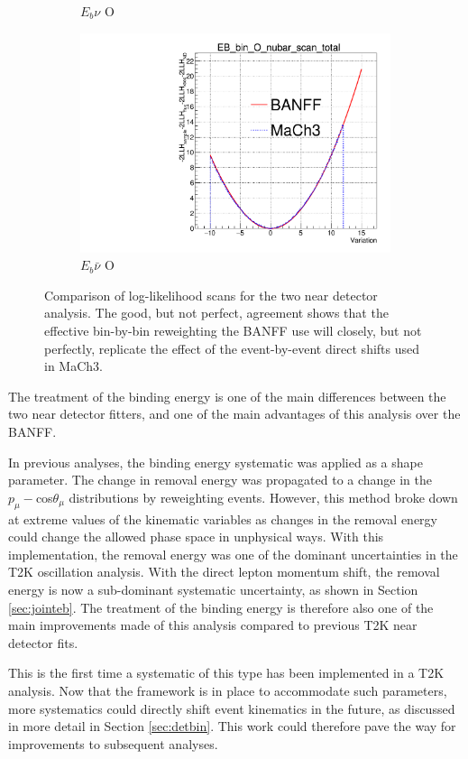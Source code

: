 \begin{figure}
\begin{subfigure}{.48\textwidth}
  \caption{$E_{b}\nu$ O}
\end{subfigure}
\begin{subfigure}{.48\textwidth}
  \centering
  \includegraphics[width=0.73\linewidth]{figs/EB_dial_O_nubar_full_FullLLH}
  \caption{$E_{b}\bar{\nu}$ O}
\end{subfigure}
\caption{Comparison of log-likelihood scans for the two near detector analysis. The good, but not perfect, agreement shows that the effective bin-by-bin reweighting the BANFF use will closely, but not perfectly, replicate the effect of the event-by-event direct shifts used in MaCh3.}
\label{fig:EbLLHBANFF}
\end{figure}

The treatment of the binding energy is one of the main differences between the two near detector fitters, and one of the main advantages of this analysis over the BANFF. 

In previous analyses, the binding energy systematic was applied as a shape parameter. The change in removal energy was propagated to a change in the $p_{\mu}-$cos$\theta_{\mu}$ distributions by reweighting events. However, this method broke down at extreme values of the kinematic variables as changes in the removal energy could change the allowed phase space in unphysical ways. With this implementation, the removal energy was one of the dominant uncertainties in the T2K oscillation analysis. With the direct lepton momentum shift, the removal energy is now a sub-dominant systematic uncertainty, as shown in Section \ref{sec:jointeb}. The treatment of the binding energy is therefore also one of the main improvements made of this analysis compared to previous T2K near detector fits.

This is the first time a systematic of this type has been implemented in a T2K analysis. Now that the framework is in place to accommodate such parameters, more systematics could directly shift event kinematics in the future, as discussed in more detail in Section \ref{sec:detbin}. This work could therefore pave the way for improvements to subsequent analyses.

